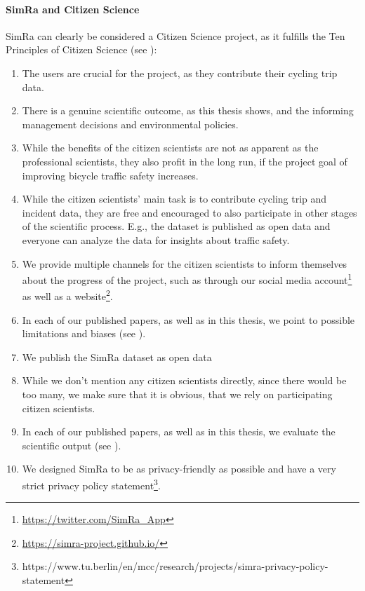 \paragraph{SimRa and Citizen Science}
SimRa can clearly be considered a Citizen Science project, as it fulfills the Ten Principles of Citizen Science (see ):
\begin{enumerate}
\item The users are crucial for the project, as they contribute their cycling trip data.
\item There is a genuine scientific outcome, as this thesis shows, and the informing management decisions and environmental policies.
\item While the benefits of the citizen scientists are not as apparent as the professional scientists, they also profit in the long run, if the project goal of improving bicycle traffic safety increases.
\item While the citizen scientists' main task is to contribute cycling trip and incident data, they are free and encouraged to also participate in other stages of the scientific process.
E.g., the dataset is published as open data and everyone can analyze the data for insights about traffic safety.
\item We provide multiple channels for the citizen scientists to inform themselves about the progress of the project, such as through our social media account\footnote{\url{https://twitter.com/SimRa_App}} as well as a website\footnote{\url{https://simra-project.github.io/}}.
\item In each of our published papers, as well as in this thesis, we point to possible limitations and biases (see ). 
\item We publish the SimRa dataset as open data~\cite{dataset_simra_set1,dataset_simra_set2,dataset_simra_set3}
\item While we don't mention any citizen scientists directly, since there would be too many, we make sure that it is obvious, that we rely on participating citizen scientists.
\item In each of our published papers, as well as in this thesis, we evaluate the scientific output (see ). 
\item We designed SimRa to be as privacy-friendly as possible and have a very strict privacy policy statement\footnote{https://www.tu.berlin/en/mcc/research/projects/simra-privacy-policy-statement}.
\end{enumerate}

